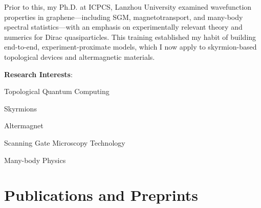 \documentclass[letterpaper,11pt]{article}
\begin{document}
Prior to this, my Ph.D. at ICPCS, Lanzhou University examined wavefunction properties in graphene—including SGM, magnetotransport, and many-body spectral statistics—with an emphasis on experimentally relevant theory and numerics for Dirac quasiparticles. This training established my habit of building end-to-end, experiment-proximate models, which I now apply to skyrmion-based topological devices and altermagnetic materials.

\vspace{0.6em}
\textbf{Research Interests}:
\begin{description}[font=$\bullet$]
\item {Topological Quantum Computing}
\item {Skyrmions}
\item {Altermagnet}
\item {Scanning Gate Microscopy Technology}
\item {Many-body Physics}
\end{description}

\section{Publications and Preprints}
\end{document}
